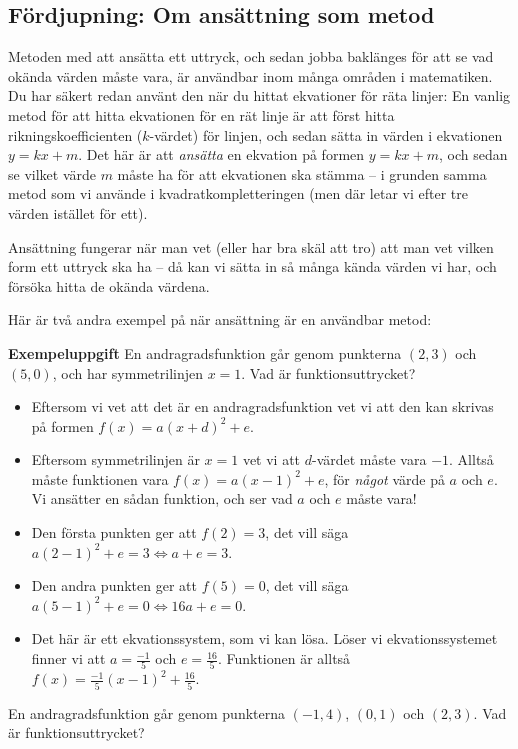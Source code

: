 \subsection{Fördjupning: Om ansättning som metod}

Metoden med att ansätta ett uttryck, och sedan jobba baklänges för att se vad okända värden måste vara, är användbar inom många områden i matematiken.
Du har säkert redan använt den när du hittat ekvationer för räta linjer:
En vanlig metod för att hitta ekvationen för en rät linje är att först hitta rikningskoefficienten ($k$-värdet) för linjen, och sedan sätta in värden i ekvationen $y=kx+m$.
Det här är att \emph{ansätta} en ekvation på formen $y=kx+m$, och sedan se vilket värde $m$ måste ha för att ekvationen ska stämma -- i grunden samma metod som vi använde i kvadratkompletteringen (men där letar vi efter tre värden istället för ett).

Ansättning fungerar när man vet (eller har bra skäl att tro) att man vet vilken form ett uttryck ska ha -- då kan vi sätta in så många kända värden vi har, och försöka hitta de okända värdena.

Här är två andra exempel på när ansättning är en användbar metod:

\textbf{Exempeluppgift}
En andragradsfunktion går genom punkterna $(2, 3)$ och $(5, 0)$, och har symmetrilinjen $x=1$. Vad är funktionsuttrycket?

\begin{itemize}
  \item Eftersom vi vet att det är en andragradsfunktion vet vi att den kan skrivas på formen $f(x)=a(x+d)^2+e$.
  \item Eftersom symmetrilinjen är $x=1$ vet vi att $d$-värdet måste vara $-1$.
  Alltså måste funktionen vara $f(x)=a(x-1)^2+e$, för \emph{något} värde på $a$ och $e$.
  Vi ansätter en sådan funktion, och ser vad $a$ och $e$ måste vara!
  \item Den första punkten ger att $f(2)=3$, det vill säga $a(2-1)^2+e=3 \Leftrightarrow a+e=3$.
  \item Den andra punkten ger att $f(5)=0$, det vill säga $a(5-1)^2+e=0 \Leftrightarrow 16a+e=0$.
  \item Det här är ett ekvationssystem, som vi kan lösa.
  Löser vi ekvationssystemet finner vi att $a=\frac{-1}{5}$ och $e=\frac{16}{5}$.
  Funktionen är alltså $f(x)=\frac{-1}{5}(x-1)^2 + \frac{16}{5}$.
\end{itemize}

En andragradsfunktion går genom punkterna $(-1, 4)$, $(0, 1)$ och $(2, 3)$. Vad är funktionsuttrycket?

